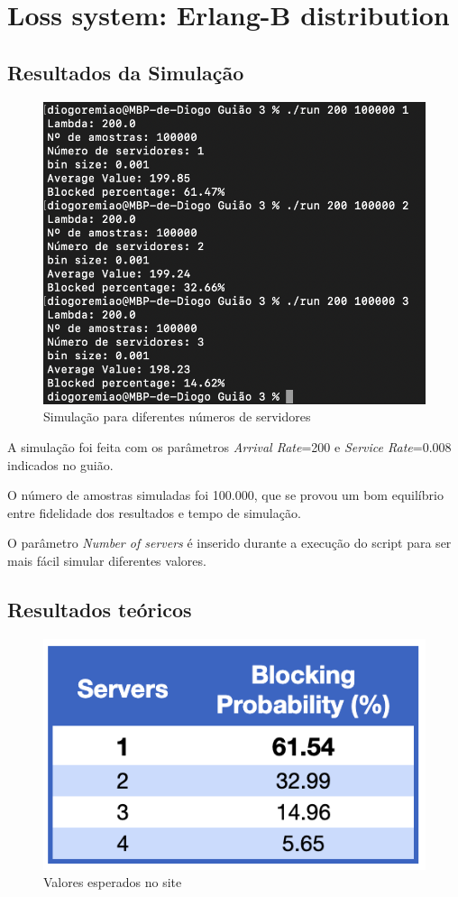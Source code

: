 \section*{Loss system: Erlang-B distribution} \label{ex_1}

\subsection*{Resultados da Simulação}

\begin{figure}[H]
    \centering
    \includegraphics[width=.8\linewidth]{figs/image_1.png}
    \caption{Simulação para diferentes números de servidores}
    \label{fig:1}
\end{figure}

A simulação foi feita com os parâmetros \textit{Arrival Rate}=200 e \textit{Service Rate}=0.008 indicados no guião.

O número de amostras simuladas foi 100.000, que se provou um bom equilíbrio entre fidelidade dos resultados e tempo de simulação.

O parâmetro \textit{Number of servers} é inserido durante a execução do script para ser mais fácil simular diferentes valores.

\subsection*{Resultados teóricos}

\begin{figure}[H]
    \centering
    \includegraphics[width=.5\linewidth]{figs/image_2.png}
    \caption{Valores esperados no site}
    \label{fig:2}
\end{figure}

